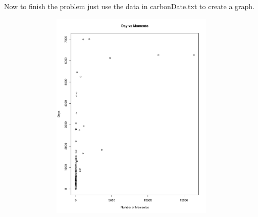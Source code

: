 \documentclass[12pt]{article}
\begin{document}
Now to finish the problem just use the data in carbonDate.txt to create a graph.

\begin{figure}[h]
\centering
 \includegraphics[page=1,
    width=4.5in,
    height=4in]{carbonDate.pdf}
\end{figure}
\end{document}
